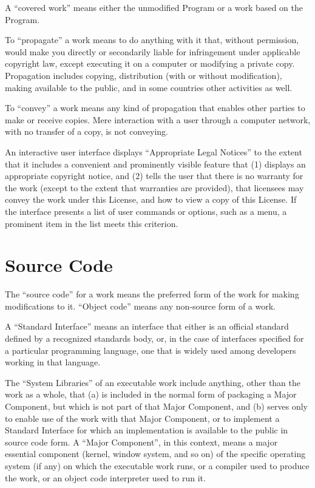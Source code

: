 A “covered work” means either the unmodified Program or a work based on the Program.

To “propagate” a work means to do anything with it that, without permission, would make you directly or secondarily liable for infringement under applicable copyright law, except executing it on a computer or modifying a private copy. Propagation includes copying, distribution (with or without modification), making available to the public, and in some countries other activities as well.

To “convey” a work means any kind of propagation that enables other parties to make or receive copies. Mere interaction with a user through a computer network, with no transfer of a copy, is not conveying.

An interactive user interface displays “Appropriate Legal Notices” to the extent that it includes a convenient and prominently visible feature that (1) displays an appropriate copyright notice, and (2) tells the user that there is no warranty for the work (except to the extent that warranties are provided), that licensees may convey the work under this License, and how to view a copy of this License. If the interface presents a list of user commands or options, such as a menu, a prominent item in the list meets this criterion.
\section{Source Code}

The “source code” for a work means the preferred form of the work for making modifications to it. “Object code” means any non-source form of a work.

A “Standard Interface” means an interface that either is an official standard defined by a recognized standards body, or, in the case of interfaces specified for a particular programming language, one that is widely used among developers working in that language.

The “System Libraries” of an executable work include anything, other than the work as a whole, that (a) is included in the normal form of packaging a Major Component, but which is not part of that Major Component, and (b) serves only to enable use of the work with that Major Component, or to implement a Standard Interface for which an implementation is available to the public in source code form. A “Major Component”, in this context, means a major essential component (kernel, window system, and so on) of the specific operating system (if any) on which the executable work runs, or a compiler used to produce the work, or an object code interpreter used to run it.

